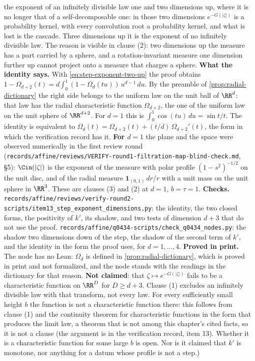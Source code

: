 \begin{proposition}
{the exponent of an infinitely divisible law one and two dimensions up, where it is no longer
that of a self-decomposable one: in those two dimensions $e^{-G(|\zeta|)}$ is a probability
kernel, with every convolution root a probability kernel, and what is lost is the cascade. Three
dimensions up it is the exponent of no infinitely divisible law. The reason is visible in clause
(2): two dimensions up the \Levy{} measure has a part carried by a sphere, and a
rotation-invariant measure one dimension further up cannot project onto a measure that charges a
sphere. \textbf{What the identity says.} With \ref{eq:step-exponent-two-up} the proof obtains
$1 - \Omega_{d+2}(t) = d\int_0^1(1 - \Omega_d(tu))\,u^{d-1}\,du$. By the preamble of
\ref{prop:radial-dictionary} the right side belongs to the uniform law on the unit ball of
$\RR^d$: that law has the radial characteristic function $\Omega_{d+2}$, the one of the uniform
law on the unit sphere of $\RR^{d+2}$. For $d = 1$ this is $\int_0^1\cos(tu)\,du = \sin t/t$.
The identity is equivalent to $\Omega_d(t) = \Omega_{d+2}(t) + (t/d)\,\Omega_{d+2}'(t)$, the form
in which the verification record has it. \textbf{For $d = 1$} the plane and the space were
observed numerically in the first review round
(\texttt{records/affine/reviews/VERIFY-round1-filtration-map-blind-check.md}, \S 5): $\Cin(|\zeta|)$
is the exponent of the \Levy{} measure with polar profile $(1 - s^2)^{-1/2}$ on the unit disc,
and of the radial measure $\mathbf 1_{(0,1)}\,dr/r$ with a unit mass on the unit sphere in
$\RR^3$. These are clauses (3) and (2) at $d = 1$, $b = \tau = 1$. \textbf{Checks.}
\texttt{records/affine/reviews/verify-round2-scripts/item13\_step\_exponent\_dimensions.py}:
the identity, the two closed forms, the positivity of $k'$, its shadow, and two tests of
dimension $d + 3$ that do not use the proof. \texttt{records/affine/q0434-scripts/check\_q0434\_nodes.py}:
the shadow two dimensions down of the step, the shadow of the second term of $k'$, and the
identity in the form the proof uses, for $d = 1,\dots,4$. \textbf{Proved in print.} The node has
no Lean: $\Omega_d$ is defined in \ref{prop:radial-dictionary}, which is proved in print and not
formalized, and the node stands with the readings in the dictionary for that reason. \textbf{Not
claimed}: that $\zeta \mapsto e^{-G(|\zeta|)}$ fails to be a characteristic function on $\RR^D$
for $D \ge d + 3$. Clause (1) excludes an infinitely divisible law with that transform, not every
law. For every sufficiently small height $b$ the function is not a characteristic function there:
this follows from clause (1) and the continuity theorem for characteristic functions in the form
that produces the limit law, a theorem that is not among this chapter's cited facts, so it is not
a clause (the argument is in the verification record, item 13). Whether it is a characteristic
function for some large $b$ is open. Nor is it claimed that $k'$ is monotone, nor anything for a
datum whose profile is not a step.)}
\end{proposition}

